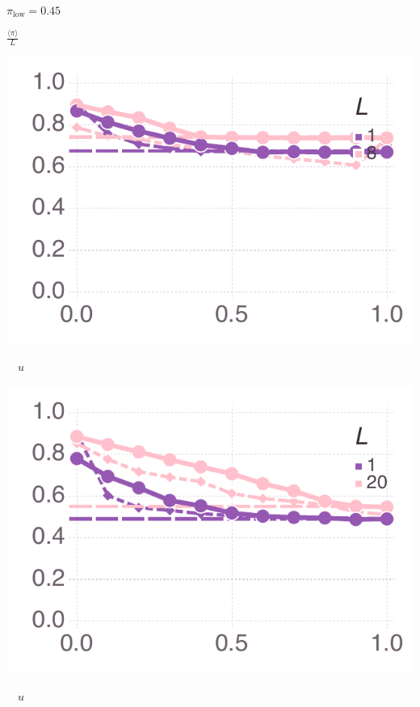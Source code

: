 \documentclass[varwidth=true,crop=false]{standalone}
\newcommand{\pisub}[1]{\pi_{\mathrm{#1}}}
\newcommand{\pilow}{\pisub{low}}
\newcommand{\meanvar}[1]{\langle #1 \rangle}
\newcommand{\meanpi}{\meanvar{\pi}}
\begin{document}
\begin{minipage}{3.75in}
    \end{minipage}~\\[0.5em]

    \begin{minipage}{3.75in}
    \begin{rotate}{90}
      {\parbox{2.5in}{
          \centering
          \vspace{-2.5em} {\huge$ \pilow = 0.45$} \\
          {\begin{rotate}{-90}{\huge $\frac{\meanpi}{L}$}\hspace{3em}\end{rotate}}
      }}
    \end{rotate}%
    \hspace{2em}
      \includegraphics[width=\textwidth]{Figures/mean_prev_net_payoff_over_u_lowpayoff=0.45_nbehaviors=2.pdf}
        \\[-2.75em]
        \begin{center}
          {\hspace{3.25em} \huge $\quad u$}
      \end{center}
        \end{minipage}\noindent\begin{minipage}{3.75in}%
      \includegraphics[width=\textwidth]{Figures/mean_prev_net_payoff_over_u_lowpayoff=0.45_nbehaviors=10.pdf}
      \\[-2.75em]
      \begin{center}
        {\huge $\quad u$}
      \end{center}
    \end{minipage}
\end{document}
